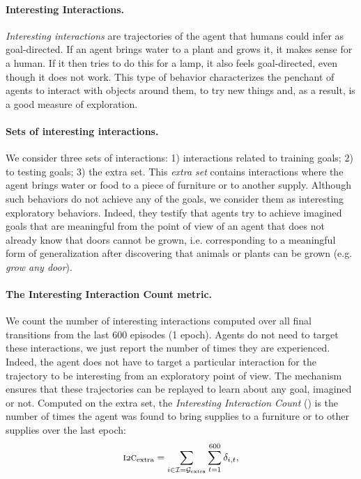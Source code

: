 \paragraph{Interesting Interactions.} \textit{Interesting interactions} are trajectories of the agent that humans could infer as goal-directed. If an agent brings water to a plant and grows it, it makes sense for a human. If it then tries to do this for a lamp, it also feels goal-directed, even though it does not work. This type of behavior characterizes the penchant of agents to interact with objects around them, to try new things and, as a result, is a good measure of exploration. 

\paragraph{Sets of interesting interactions.} We consider three sets of interactions: 1) interactions related to training goals; 2) to testing goals; 3) the extra set. This \textit{extra set} contains interactions where the agent brings water or food to a piece of furniture or to another supply. Although such behaviors do not achieve any of the goals, we consider them as interesting exploratory behaviors. Indeed, they testify that agents try to achieve imagined goals that are meaningful from the point of view of an agent that does not already know that doors cannot be grown, i.e. corresponding to a meaningful form of generalization after discovering that animals or plants can be grown (e.g. \textit{grow any door}). 

\paragraph{The Interesting Interaction Count metric.} 
We count the number of interesting interactions computed over all final transitions from the last $600$ episodes (1 epoch). Agents do not need to target these interactions, we just report the number of times they are experienced. Indeed, the agent does not have to target a particular interaction for the trajectory to be interesting from an exploratory point of view. The \her mechanism ensures that these trajectories can be replayed to learn about any goal, imagined or not. Computed on the extra set, the \textit{Interesting Interaction Count} (\itwoc) is the number of times the agent was found to bring supplies to a furniture or to other supplies over the last epoch: 
    \begin{displaymath}
    \itwoc_{\text{extra}} = \sum_{i\in \mathcal{I}=\G_\text{extra}} \sum_{t=1}^{600} \delta_{i,t},
    \end{displaymath}

